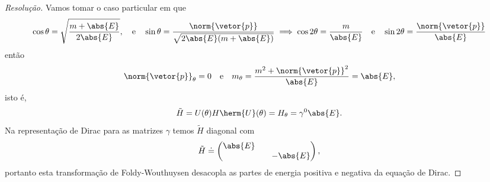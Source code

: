 \begin{proof}[Resolução]
    Vamos tomar o caso particular em que
    \begin{equation*}
        \cos\theta = \sqrt{\frac{m + \abs{E}}{2 \abs{E}}},
        \quad\text{e}\quad
        \sin\theta = \frac{\norm{\vetor{p}}}{\sqrt{2\abs{E}(m + \abs{E})}}
        \implies
        \cos{2\theta} = \frac{m}{\abs{E}}
        \quad\text{e}\quad
        \sin{2\theta} = \frac{\norm{\vetor{p}}}{\abs{E}}
    \end{equation*}
    então
    \begin{equation*}
        \norm{\vetor{p}}_\theta = 0\quad\text{e}\quad m_\theta = \frac{m^2 + \norm{\vetor{p}}^2}{\abs{E}} = \abs{E},
    \end{equation*}
    isto é,
    \begin{equation*}
        \tilde{H} = U(\theta) H \herm{U}(\theta) = H_\theta = \gamma^0 \abs{E}.
    \end{equation*}
    Na representação de Dirac para as matrizes \(\gamma\) temos \(\tilde{H}\) diagonal com
    \begin{equation*}
        \tilde{H} \doteq \begin{pmatrix}
            \abs{E} &&\\
                    && -\abs{E}
        \end{pmatrix},
    \end{equation*}
    portanto esta transformação de Foldy-Wouthuysen desacopla as partes de energia positiva e negativa da equação de Dirac.
\end{proof}
